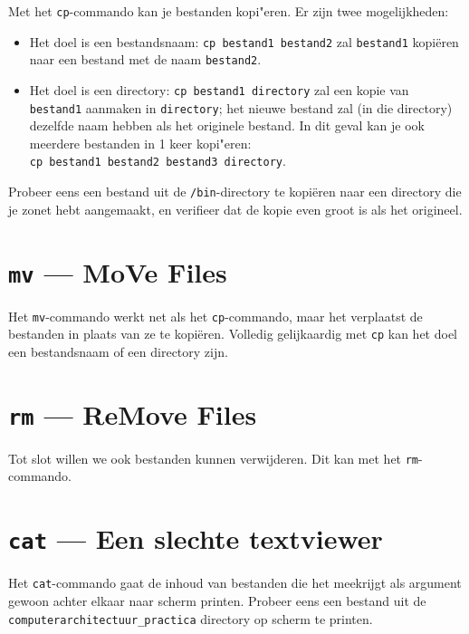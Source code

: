 \documentclass[a4paper,twoside,openany]{memoir}
\begin{document}
Met het \verb!cp!-commando kan je bestanden kopi"eren. Er zijn twee mogelijkheden:

\begin{itemize}

  \item Het doel is een bestandsnaam: \verb!cp bestand1 bestand2! zal
    \verb!bestand1! kopiëren naar een bestand met de naam \verb!bestand2!.

  \item Het doel is een directory: \verb!cp bestand1 directory! zal een kopie
    van \verb!bestand1! aanmaken in \verb!directory!; het nieuwe bestand zal (in
    die directory) dezelfde naam hebben als het originele bestand. In dit geval
    kan je ook meerdere bestanden in 1 keer kopi"eren:\\
    \verb!cp bestand1 bestand2 bestand3 directory!.

\end{itemize}

Probeer eens een bestand uit de \verb!/bin!-directory te kopiëren naar een
directory die je zonet hebt aangemaakt, en verifieer dat de kopie even groot is
als het origineel.

\section{\texttt{mv} --- MoVe Files}

Het \verb!mv!-commando werkt net als het \verb!cp!-commando, maar het verplaatst
de bestanden in plaats van ze te kopiëren. Volledig gelijkaardig met \verb!cp!
kan het doel een bestandsnaam of een directory zijn.

\section{\texttt{rm} --- ReMove Files}

Tot slot willen we ook bestanden kunnen verwijderen. Dit kan met het
\verb!rm!-commando.

\section{\texttt{cat} --- Een slechte textviewer}

Het \verb!cat!-commando gaat de inhoud van bestanden die het meekrijgt als
argument gewoon achter elkaar naar scherm printen. Probeer eens een bestand uit
de \verb!computerarchitectuur_practica! directory op scherm te printen.
\end{document}
